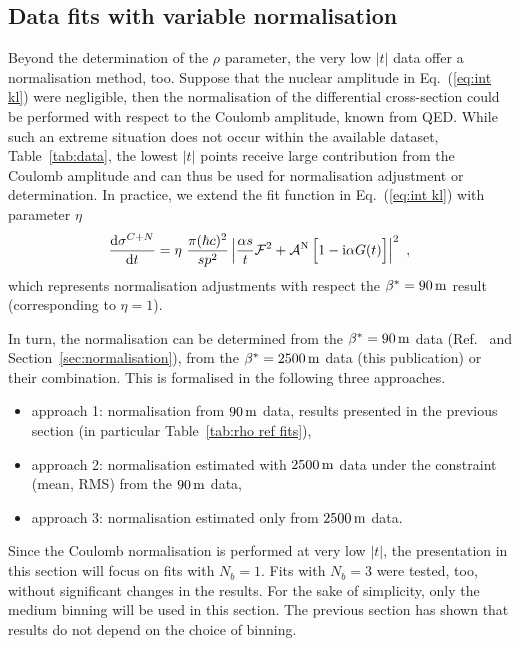 \subsection{Data fits with variable normalisation}
\label{sec:rho anal norm var}

Beyond the determination of the $\rho$ parameter, the very low $|t|$ data offer a normalisation method, too. Suppose that the nuclear amplitude in Eq.~(\ref{eq:int kl}) were negligible, then the normalisation of the differential cross-section could be performed with respect to the Coulomb amplitude, known from QED. While such an extreme situation does not occur within the available dataset, Table~\ref{tab:data}, the lowest $|t|$ points receive large contribution from the Coulomb amplitude and can thus be used for normalisation adjustment or determination. In practice, we extend the fit function in Eq.~(\ref{eq:int kl}) with parameter $\eta$
\begin{equation}
\label{eq:fit fcn eta}
{\d\sigma^{C+N}\over \d t} = \eta\ {\pi (\hbar c)^2 \over s p^2} \left | {\alpha s\over t} {\cal F}^2
			+ {\cal A}^{\rm N}\, \Big[1 - \I\alpha G(t)\Big] \right |^2\ ,
\end{equation}
which represents normalisation adjustments with respect the $\beta^* = 90\,{\rm m}$ result \cite{totem-13tev-90m} (corresponding to $\eta = 1$).

In turn, the normalisation can be determined from the $\beta^* = 90\,{\rm m}$ data (Ref.~\cite{totem-13tev-90m} and Section~\ref{sec:normalisation}), from the $\beta^* = 2500\,{\rm m}$ data (this publication) or their combination. This is formalised in the following three approaches.
\begin{itemize}
\item approach 1: normalisation from $90\,{\rm m}$ data, results presented in the previous section (in particular Table~\ref{tab:rho ref fits}),
\item approach 2: normalisation estimated with $2500\,{\rm m}$ data under the constraint (mean, RMS) from the $90\,{\rm m}$ data,
\item approach 3: normalisation estimated only from $2500\,{\rm m}$ data.
\end{itemize}

Since the Coulomb normalisation is performed at very low $|t|$, the presentation in this section will focus on fits with $N_b = 1$. Fits with $N_b = 3$ were tested, too, without significant changes in the results. For the sake of simplicity, only the medium binning will be used in this section. The previous section has shown that results do not depend on the choice of binning.

